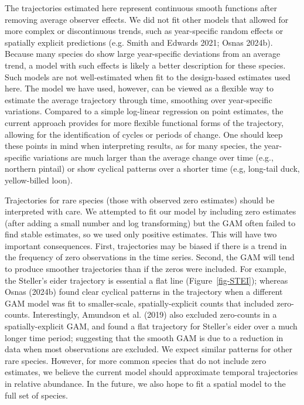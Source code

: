 \documentclass[
]{article}
\begin{document}
The trajectories estimated here represent continuous smooth functions
after removing average observer effects. We did not fit other models
that allowed for more complex or discontinuous trends, such as
year-specific random effects or spatially explicit predictions (e.g.
Smith and Edwards 2021; Osnas 2024b). Because many species do show large
year-specific deviations from an average trend, a model with such
effects is likely a better description for these species. Such models
are not well-estimated when fit to the design-based estimates used here.
The model we have used, however, can be viewed as a flexible way to
estimate the average trajectory through time, smoothing over
year-specific variations. Compared to a simple log-linear regression on
point estimates, the current approach provides for more flexible
functional forms of the trajectory, allowing for the identification of
cycles or periods of change. One should keep these points in mind when
interpreting results, as for many species, the year-specific variations
are much larger than the average change over time (e.g., northern
pintail) or show cyclical patterns over a shorter time (e.g, long-tail
duck, yellow-billed loon).

Trajectories for rare species (those with observed zero estimates)
should be interpreted with care. We attempted to fit our model by
including zero estimates (after adding a small number and log
transforming) but the GAM often failed to find stable estimates, so we
used only positive estimates. This will have two important consequences.
First, trajectories may be biased if there is a trend in the frequency
of zero observations in the time series. Second, the GAM will tend to
produce smoother trajectories than if the zeros were included. For
example, the Steller's eider trajectory is essential a flat line
(Figure~\ref{fig-STEI}); whereas Osnas (2024b) found clear cyclical
patterns in the trajectory when a different GAM model was fit to
smaller-scale, spatially-explicit counts that included zero-counts.
Interestingly, Amundson et al. (2019) also excluded zero-counts in a
spatially-explicit GAM, and found a flat trajectory for Steller's eider
over a much longer time period; suggesting that the smooth GAM is due to
a reduction in data when most observations are excluded. We expect
similar patterns for other rare species. However, for more common
species that do not include zero estimates, we believe the current model
should approximate temporal trajectories in relative abundance. In the
future, we also hope to fit a spatial model to the full set of species.
\end{document}
